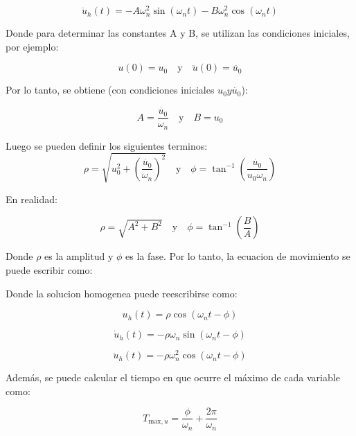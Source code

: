 \documentclass{article}  %
\begin{document}
\begin{equation}
    \ddot{u}_h(t) = -A \omega_n^2 \sin(\omega_n t) - B \omega_n^2 \cos(\omega_n t)
\end{equation}

Donde para determinar las constantes A y B, se utilizan las condiciones iniciales, por ejemplo:

\begin{equation}
    u(0) = u_0 \quad \text{y} \quad \ddot{u}(0) = \ddot{u_0}
\end{equation}

Por lo tanto, se obtiene (con condiciones iniciales $u_0 y \dot{u_0}$):

\begin{equation}
    A = \frac{\dot{u_0}}{\omega_n} \quad \text{y} \quad B = u_0
\end{equation}

Luego se pueden definir los siguientes terminos:
\begin{equation}
    \rho = \sqrt{u_0^2 + (\frac{\dot{u_0}}{\omega_n})^2} \quad \text{y} \quad \phi = \tan^{-1}(\frac{\dot{u_0}}{u_0 \omega_n})
\end{equation}

En realidad:

\begin{equation}
    \rho = \sqrt{A^2 + B^2} \quad \text{y} \quad \phi = \tan^{-1}(\frac{B}{A})
\end{equation}

Donde $\rho$ es la amplitud y $\phi$ es la fase. Por lo tanto, la ecuacion de movimiento se puede escribir como:

Donde la solucion homogenea puede reescribirse como:

\begin{equation}
    u_h(t) = \rho \cos(\omega_n t - \phi) 
\end{equation}

\begin{equation}
    \dot{u}_h(t) = -\rho \omega_n \sin(\omega_n t - \phi)
\end{equation}

\begin{equation}
    \ddot{u}_h(t) = -\rho \omega_n^2 \cos(\omega_n t - \phi)
\end{equation}

Además, se puede calcular el tiempo en que ocurre el máximo de cada variable como:

\begin{equation}
    T_{\text{max},u} = \frac{\phi}{\omega_n} + \frac{2\pi}{\omega_n}
\end{equation}
\end{document}
